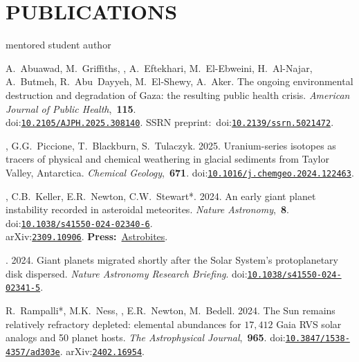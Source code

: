\section{PUBLICATIONS}
\hfill* mentored student author
\newcommand{\inprep}[1]{\textit{#1} [in prep.]}
\newcommand{\submitted}[1]{\textit{#1} [submitted]}
\newcommand{\inreview}[1]{\textit{#1} [in review]}
\newcommand{\inpress}[1]{\textit{#1} [in press]}
\newcommand{\doi}[1]{doi:\href{https://doi.org/#1}{\texttt{#1}}}
\newcommand{\arxiv}[1]{arXiv:\href{https://arxiv.org/abs/#1}{\texttt{#1}}}
\newcommand{\press}[2]{\textbf{Press:}~\href{#1}{#2}}
\newcommand{\pub}[2]{\textit{#1},~\textbf{#2}}

\begin{etaremune} [itemsep=4pt, leftmargin=3ex]
    \item A.~Abuawad, M.~Griffiths, \ghedwards, A.~Eftekhari, M.~El-Ebweini, H.~Al-Najar, A.~Butmeh, R.~Abu~Dayyeh, M.~El-Shewy, A.~Aker. The ongoing environmental destruction and degradation of Gaza: the resulting public health crisis. \pub{American Journal of Public Health}{115}. \\\doi{10.2105/AJPH.2025.308140}. SSRN preprint:~\doi{10.2139/ssrn.5021472}.
 
    \item \ghedwards, G.G.~Piccione, T.~Blackburn,  S.~Tulaczyk. 2025. Uranium-series isotopes as tracers of physical and chemical weathering in glacial sediments from Taylor Valley, Antarctica. \pub{Chemical Geology}{671}. \doi{10.1016/j.chemgeo.2024.122463}.
        
    \item \ghedwards, C.B.~Keller, E.R.~Newton, C.W.~Stewart*. 2024. An early giant planet instability recorded in asteroidal meteorites. \pub{Nature Astronomy}{8}. \doi{10.1038/s41550-024-02340-6}. \\\arxiv{2309.10906}. \press{https://astrobites.org/2023/09/25/meteorites-planet-migration/}{Astrobites}.
    
    \item \ghedwards. 2024. Giant planets migrated shortly after the Solar System’s protoplanetary disk dispersed. \textit{Nature Astronomy Research Briefing}. \doi{10.1038/s41550-024-02341-5}.
    
    \item R.~Rampalli*, M.K.~Ness, \ghedwards, E.R.~Newton, M.~Bedell. 2024. The Sun remains relatively refractory depleted: elemental abundances for $17,412$ Gaia RVS solar analogs and 50 planet hosts. \pub{The Astrophysical Journal}{965}. \doi{10.3847/1538-4357/ad303e}. \arxiv{2402.16954}.
    

\end{etaremune}
